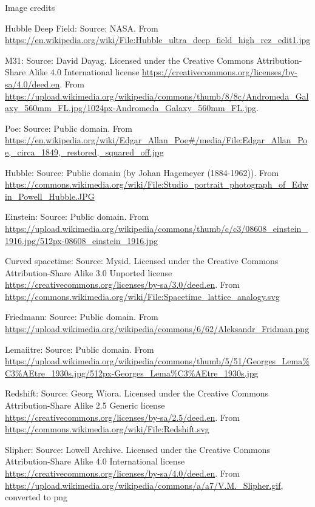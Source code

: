 \documentclass[usenames,dvipsnames,12pt,compress]{beamer}
\begin{document}
\begin{frame}{Image credits}
  \begin{enumerate}
  \tiny {
  \item{Hubble Deep Field: Source: NASA. From \url{https://en.wikipedia.org/wiki/File:Hubble_ultra_deep_field_high_rez_edit1.jpg}}
  \item{M31: Source: David Dayag. Licensed under the Creative Commons Attribution-Share Alike 4.0 International license \url{https://creativecommons.org/licenses/by-sa/4.0/deed.en}. From \url{https://upload.wikimedia.org/wikipedia/commons/thumb/8/8c/Andromeda_Galaxy_560mm_FL.jpg/1024px-Andromeda_Galaxy_560mm_FL.jpg}.}
  \item{Poe: Source: Public domain. From \url{https://en.wikipedia.org/wiki/Edgar_Allan_Poe\#/media/File:Edgar_Allan_Poe,_circa_1849,_restored,_squared_off.jpg}}
  \item{Hubble: Source: Public domain (by Johan Hagemeyer (1884-1962)). From \url{https://commons.wikimedia.org/wiki/File:Studio_portrait_photograph_of_Edwin_Powell_Hubble.JPG}}
  \item{Einstein: Source: Public domain. From \url{https://upload.wikimedia.org/wikipedia/commons/thumb/c/c3/08608_einstein_1916.jpg/512px-08608_einstein_1916.jpg}}
  \item{Curved spacetime: Source: Mysid. Licensed under the Creative Commons Attribution-Share Alike 3.0 Unported license \url{https://creativecommons.org/licenses/by-sa/3.0/deed.en}. From \url{https://commons.wikimedia.org/wiki/File:Spacetime_lattice_analogy.svg}}
  \item{Friedmann: Source: Public domain. From \url{https://upload.wikimedia.org/wikipedia/commons/6/62/Aleksandr_Fridman.png}}
  \item{Lemaiitre: Source: Public domain. From \url{https://upload.wikimedia.org/wikipedia/commons/thumb/5/51/Georges_Lema\%C3\%AEtre_1930s.jpg/512px-Georges_Lema\%C3\%AEtre_1930s.jpg}}  
  \item{Redshift: Source: Georg Wiora. Licensed under the Creative Commons Attribution-Share Alike 2.5 Generic license \url{https://creativecommons.org/licenses/by-sa/2.5/deed.en}. From \url{https://commons.wikimedia.org/wiki/File:Redshift.svg}}
  \item{Slipher: Source: Lowell Archive. Licensed under the Creative Commons Attribution-Share Alike 4.0 International license \url{https://creativecommons.org/licenses/by-sa/4.0/deed.en}. From \url{https://upload.wikimedia.org/wikipedia/commons/a/a7/V.M._Slipher.gif}, converted to png}  
  } %
  \end{enumerate}
\end{frame}
\end{document}
